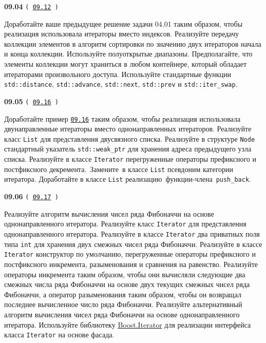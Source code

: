 \documentclass[a4paper,12pt]{article}
\begin{document}
\bigskip

{\large \textbf{09.04} \texttt{(\,\href{https://github.com/i-s-m-mipt/Education/blob/master/projects/examples/source/09.12.cpp}{09.12}\,)}}

\bigskip

Доработайте ваше предыдущее решение задачи 04.01 таким образом, чтобы реализация использовала итераторы вместо индексов. Реализуйте передачу коллекции элементов в алгоритм сортировки по значению двух итераторов начала и конца коллекции. Используйте полуоткрытые диапазоны. Предполагайте, что элементы коллекции могут храниться в любом контейнере, который обладает итераторами произвольного доступа. Используйте стандартные функции \lstinline{std::distance}, \lstinline{std::advance}, \lstinline{std::next}, \lstinline{std::prev} и \lstinline{std::iter_swap}.

\bigskip

{\large \textbf{09.05} \texttt{(\,\href{https://github.com/i-s-m-mipt/Education/blob/master/projects/examples/source/09.16.cpp}{09.16}\,)}}

\bigskip

Доработайте пример \href{https://github.com/i-s-m-mipt/Education/blob/master/projects/examples/source/09.16.cpp}{\texttt{09.16}} таким образом, чтобы реализация использовала двунаправленные итераторы вместо однонаправленных итераторов. Реализуйте класс \lstinline{List} для представления двусвязного списка. Реализуйте в структуре \lstinline{Node} стандартный указатель \lstinline{std::weak_ptr} для хранения адреса предыдущего узла списка. Реализуйте в классе \lstinline{Iterator} перегруженные операторы префиксного и постфиксного декремента.~Замените~в классе \lstinline{List} псевдоним категории итератора. Доработайте в классе \lstinline{List} реализацию~функции-члена~\lstinline{push_back}.

\bigskip

{\large \textbf{09.06} \texttt{(\,\href{https://github.com/i-s-m-mipt/Education/blob/master/projects/examples/source/09.17.cpp}{09.17}\,)}}

\bigskip

Реализуйте алгоритм вычисления чисел ряда Фибоначчи на основе однонаправленного итератора. Реализуйте класс \lstinline{Iterator} для представления однонаправленного итератора. Реализуйте в классе \lstinline{Iterator} два приватных поля типа \lstinline{int} для хранения двух смежных чисел ряда Фибоначчи. Реализуйте в классе \lstinline{Iterator} конструктор по умолчанию, перегруженные операторы префиксного и постфиксного инкремента, разыменования и сравнения на равенство. Реализуйте операторы инкремента таким образом, чтобы они вычисляли следующие два смежных числа ряда Фибоначчи на основе двух текущих смежных чисел ряда Фибоначчи, а оператор разыменования таким образом, чтобы он возвращал последнее вычисленное число ряда Фибоначчи. Реализуйте альтернативный алгоритм вычисления чисел ряда Фибоначчи на основе однонаправленного итератора. Используйте библиотеку \href{https://www.boost.org/doc/libs/latest/libs/iterator/doc/index.html}{Boost.Iterator} для реализации интерфейса класса \lstinline{Iterator} на основе фасада.
\end{document}
